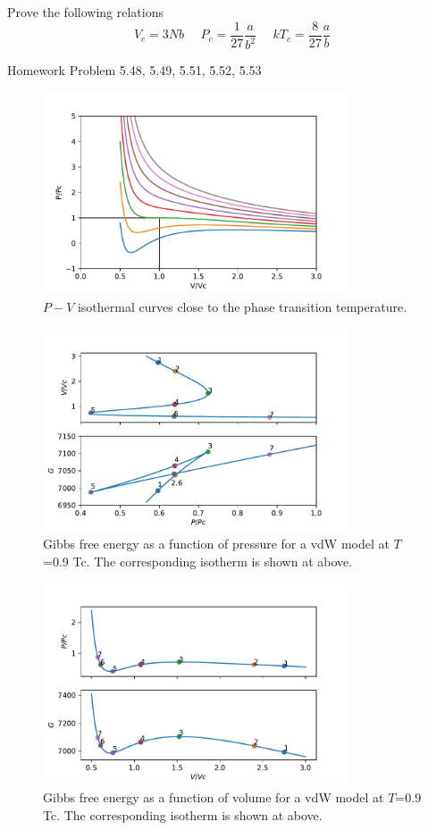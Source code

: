 Prove the following relations
\begin{equation}
V_c = 3Nb ~~~~~~  P_c = \frac{1}{27} \frac{a}{b^2} ~~~~~~ kT_c = \frac{8}{27} \frac{a}{b}
\end{equation}

Homework 
Problem 5.48, 5.49, 5.51, 5.52, 5.53


\begin{figure}[h]
\centering
\includegraphics[width=9cm]{imgs/vdW.pdf}
\caption{$P-V$ isothermal curves close to the phase transition temperature. }
\end{figure}


\begin{figure}[h]
\centering
\includegraphics[width=9cm]{imgs/MaxWell.pdf}
\caption{Gibbs free energy as a function of pressure for a vdW model at $T$=0.9 Tc. The corresponding isotherm is shown at above.}
\end{figure}

\begin{figure}[h]
\centering
\includegraphics[width=9cm]{imgs/MaxWell-f.pdf}
\caption{Gibbs free energy as a function of volume for a vdW model at $T$=0.9 Tc. The corresponding isotherm is shown at above.}
\end{figure}


